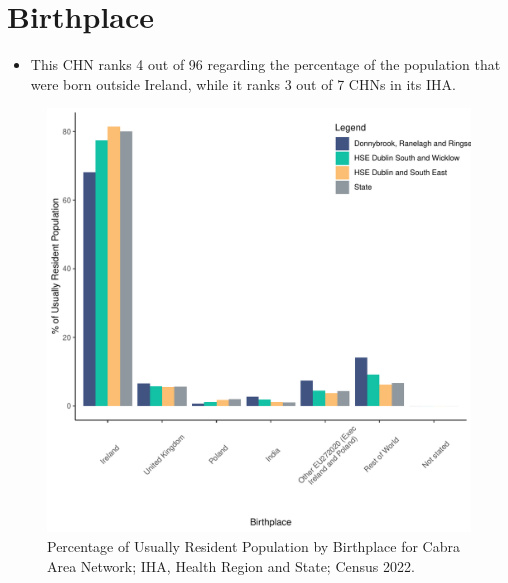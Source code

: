 \documentclass{article}
\begin{document}
\section{Birthplace}\label{sect:Birth}
\begin{itemize}
\item This CHN ranks  4 out of 96 regarding the percentage of the population that were born outside Ireland, while it ranks  3 out of 7 CHNs in its IHA.
\end{itemize}
\begin{figure}[H]
	\centering
	\includegraphics[width = 130mm]{../figures/BirthED.pdf}
	\caption{Percentage of Usually Resident Population by Birthplace for Cabra Area Network; IHA, Health Region and State; Census 2022.}
	\label{fig:vbnv}
	\end{figure}
	
\end{document}
